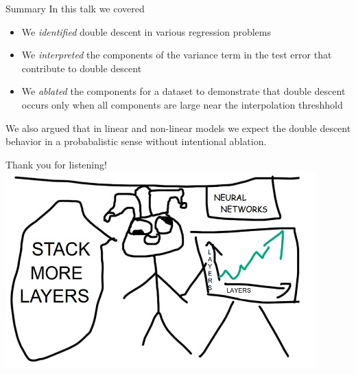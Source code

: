 \documentclass{beamer}
\begin{document}
\begin{frame}{Summary}
    In this talk we covered
    \begin{itemize}
        \item We \emph{identified} double descent in various regression problems
        \item We \emph{interpreted} the components of the variance term in the test error that contribute to double descent
        \item We \emph{ablated} the components for a dataset to demonstrate that double descent occurs only when all components are large near the interpolation threshhold
    \end{itemize}

    \hspace{5cm}

    We also argued that in linear and non-linear models we expect the double descent behavior in a probabalistic sense without intentional ablation.

\end{frame}


\begin{frame}{Thank you for listening!}
    \includegraphics[width=\textwidth]{stackmorelayers.jpg}
\end{frame}
\end{document}
